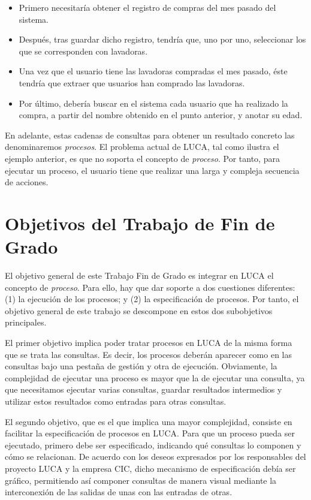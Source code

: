 \begin{itemize}
	\item Primero necesitaría obtener el registro de compras del mes pasado del sistema.
	\item Después, tras guardar dicho registro, tendría que, uno por uno, seleccionar los que se corresponden con lavadoras.
	\item Una vez que el usuario tiene las lavadoras compradas el mes pasado, éste tendría que extraer que usuarios han comprado las lavadoras.
	\item Por último, debería buscar en el sistema cada usuario que ha realizado la compra, a partir del nombre obtenido en el punto anterior, y anotar su edad.
\end{itemize}

En adelante, estas cadenas de consultas para obtener un resultado concreto las denominaremos \emph{procesos}. El problema actual de LUCA, tal como ilustra el ejemplo anterior, es que no soporta el concepto de \emph{proceso}. Por tanto, para ejecutar un proceso,  el usuario tiene que realizar una larga y compleja secuencia de acciones.

\section{Objetivos del Trabajo de Fin de Grado}

El objetivo general de este Trabajo Fin de Grado es integrar en LUCA el concepto de \emph{proceso}. Para ello, hay que dar soporte a dos cuestiones diferentes: (1) la ejecución de los procesos; y (2) la especificación de procesos. Por tanto, el objetivo general de este trabajo se descompone en estos dos subobjetivos principales.

El primer objetivo implica poder tratar procesos en LUCA de la misma forma que se trata las consultas. Es decir, los procesos deberán aparecer como en las consultas bajo una pestaña de gestión y otra de ejecución. Obviamente, la complejidad de ejecutar una proceso es mayor que la de ejecutar una consulta, ya que necesitamos ejecutar varias consultas, guardar resultados intermedios y utilizar estos resultados como entradas para otras consultas.

El segundo objetivo, que es el que implica una mayor complejidad, consiste en facilitar la especificación de procesos en LUCA. Para que un proceso pueda ser ejecutado, primero debe ser especificado, indicando qué consultas lo componen y cómo se relacionan. De acuerdo con los deseos expresados por los responsables del proyecto LUCA y la empresa CIC, dicho mecanismo de especificación debía ser gráfico, permitiendo así componer consultas de manera visual mediante la interconexión de las salidas de unas con las entradas de otras.

